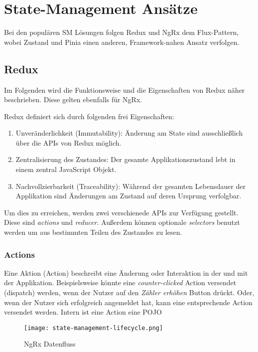 \chapter{State-Management Ansätze}

Bei den populären SM Lösungen folgen Redux und NgRx dem Flux-Pattern\cite{historyOfRedux}\cite{ngrxGettingStarted}, wobei Zustand und Pinia einen anderen, Framework-nahen Ansatz verfolgen.

\section{Redux}

Im Folgenden wird die Funktionsweise und die Eigenschaften von Redux näher beschrieben. Diese gelten ebenfalls für NgRx.

Redux definiert sich durch folgenden frei Eigenschaften:
\begin{enumerate}
  \item Unveränderlichkeit (Immutability): Änderung am State sind ausschließlich über die APIs von Redux möglich.
  \item Zentralisierung des Zustandes: Der gesamte Applikationszustand lebt in einem zentral JavaScript Objekt.
  \item Nachvollzierbarkeit (Traceability): Während der gesamten Lebensdauer der Applikation sind Änderungen am Zustand auf deren Ursprung verfolgbar.
\end{enumerate}

Um dies zu erreichen, werden zwei verschienede APIs zur Verfügung gestellt. Diese sind \textit{actions} und \textit{reducer}. Außerdem können optionale \textit{selectors} benutzt werden um aus bestimmten Teilen des Zustandes zu lesen.

\subsection{Actions}

Eine Aktion (Action) beschreibt eine Änderung oder Interaktion in der und mit der Applikation. Beispielsweise könnte eine \textit{counter-clicked} Action versendet (dispatch) werden, wenn der Nutzer auf den \textit{Zähler erhöhen} Button drückt. Oder, wenn der Nutzer sich erfolgreich angemeldet hat, kann eine entsprechende Action versendet werden. Intern ist eine Action eine POJO

\begin{figure}[h!]
\texttt{[image: state-management-lifecycle.png]}
\caption{NgRx Datenfluss}
\end{figure}